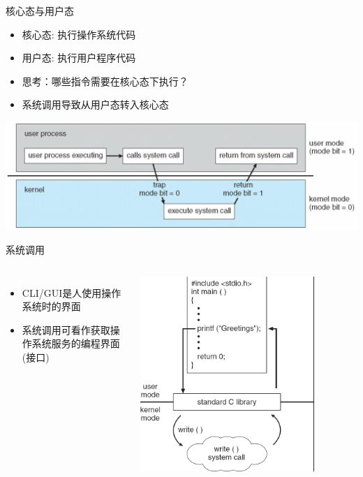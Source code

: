 \documentclass[xcolor=svgnames]{beamer}
\begin{document}
\begin{CJK*}{UTF8}{gbsn}
\begin{frame}{核心态与用户态}
\begin{itemize}
\item 核心态: 执行操作系统代码
\item 用户态: 执行用户程序代码
\item 思考：哪些指令需要在核心态下执行？
\item 系统调用导致从用户态转入核心态
\end{itemize}
\includegraphics[width=1.0\textwidth]{mode.png}
\end{frame}

\begin{frame}{系统调用}
\begin{columns}
\begin{itemize}
\item CLI/GUI是人使用操作系统时的界面
\item 系统调用可看作获取操作系统服务的编程界面(接口)
\end{itemize}
\includegraphics[width=0.8\textwidth]{printf.png}
\end{columns}
\end{frame}


\end{CJK*}
\end{document}
